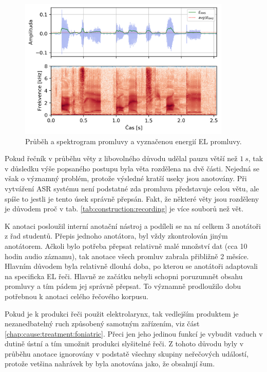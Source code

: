 \begin{figure}[hbpt]
  \centering
  \includegraphics[width=0.9\textwidth]{./ch5-construction/img/energy_spec_el.png}
  \caption{Průběh a spektrogram promluvy a vyznačenou energií EL promluvy.}
  \label{fig:construction:el_speech}
\end{figure}

Pokud řečník v průběhu věty z libovolného důvodu udělal pauzu větší než $1\ s$, tak v důsledku výše popsaného postupu byla věta rozdělena na dvě části. Nejedná se však o významný problém, protože výsledné kratší useky jsou anotovány. Při vytváření ASR systému není podstatné zda promluva představuje celou větu, ale spíše to jestli je tento úsek správně přepsán. Fakt, že některé věty jsou rozděleny je důvodem proč v tab. \ref{tab:construction:recording} je více souborů než vět.

K anotaci posloužil interní anotační nástroj a podíleli se na ní celkem 3 anotátoři z řad studentů. Přepis jednoho anotátora, byl vždy zkontrolován jiným anotátorem. Ačkoli bylo potřeba přepsat relativně malé množství dat (cca 10 hodin audio záznamu), tak anotace všech promluv zabrala přibližně 2 měsíce. Hlavním důvodem byla relativně dlouhá doba, po kterou se anotátoři adaptovali na specificka EL řeči. Hlavně ze začátku nebyli schopni poruzumnět obsahu promluvy a tím pádem jej správně přepsat. To významně prodloužilo dobu potřebnou k anotaci celého řečového korpusu.

Pokud je k produkci řeči použit elektrolarynx, tak vedlejším produktem je nezanedbatelný ruch způsobený samotným zařízením, viz část \ref{chap:cause:treatment:foniatric}. Přeci jen jeho jedinou funkcí je vybudit vzduch v dutině ústní a tím umožnit produkci slyšitelné řeči. Z tohoto důvodu byly v průběhu anotace ignorovány v podstatě všechny skupiny neřečových událostí, protože vetšina nahrávek by byla anotována jako, že obsahují šum.

